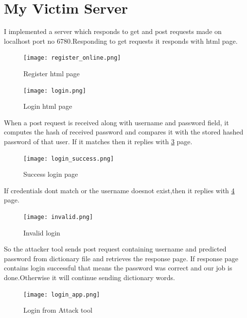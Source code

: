 \documentclass[11pt, english]{article}
\begin{document}
\section{My Victim Server}
I implemented a server which responds to get and post requests made on localhost port no 6780.Responding to get requests it responds with html page.\\
\newpage
\begin{figure}[h!]
        \begin{minipage}[b]{1\linewidth}
        \centering
        \texttt{[image: register\_online.png]} \label{register login}
        \caption{Register html page}
        \end{minipage}
\end{figure}
\begin{figure}[h!]
        \begin{minipage}[b]{1\linewidth}
        \centering
        \texttt{[image: login.png]} \label{login}
        \caption{Login html page}
        \end{minipage}
\end{figure}
When a post request is received along with username and password field, it computes the hash of received password and compares it with the stored hashed password of that user. If it matches then it replies with \ref{fig:success login} page.\\
\begin{figure}[h!]
        \begin{minipage}[b]{1\linewidth}
        \centering
        \texttt{[image: login\_success.png]} 
        \label{fig:success login}
        \caption{Success login page}
        \end{minipage}
\end{figure}
If credentials dont match or the username doesnot exist,then it replies with \ref{invalid login} page.\\
\newpage
\begin{figure}[h!]
        \begin{minipage}[b]{1\linewidth}
        \centering
        \texttt{[image: invalid.png]} \label{invalid login}
        \caption{Invalid login}
        \end{minipage}
\end{figure}
So the attacker tool sends post request containing username and predicted password from dictionary file and retrieves the response page. If response page contains login successful that means the password was correct and our job is done.Otherwise it will continue sending dictionary words.
\begin{figure}[h!]
        \begin{minipage}[b]{1\linewidth}
        \centering
        \texttt{[image: login\_app.png]} \label{login app}
        \caption{Login from Attack tool}
        \end{minipage}
\end{figure}
\end{document}
